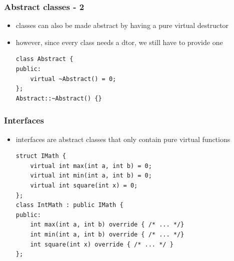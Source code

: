 \begin{frame}[fragile]
    \frametitle{Abstract classes - 2}
    \begin{itemize}
    \item classes can also be made abstract by having a pure virtual destructor
    \item however, since every class needs a dtor, we still have to provide one
    \begin{lstlisting}[numbers=none]
class Abstract {
public:
    virtual ~Abstract() = 0;
};
Abstract::~Abstract() {}
    \end{lstlisting}
    \end{itemize}
\end{frame}

\begin{frame}[fragile]
    \frametitle{Interfaces}
    \begin{itemize}
    \item interfaces are abstract classes that only contain pure virtual functions
    \begin{lstlisting}[numbers=none]
struct IMath {
    virtual int max(int a, int b) = 0;
    virtual int min(int a, int b) = 0;
    virtual int square(int x) = 0;
};
class IntMath : public IMath {
public:
    int max(int a, int b) override { /* ... */}
    int min(int a, int b) override { /* ... */}
    int square(int x) override { /* ... */ }
};
    \end{lstlisting}
    \end{itemize}
\end{frame}


